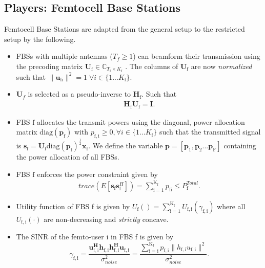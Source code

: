 \documentclass[12pt,a4paper]{report}
\begin{document}
\subsection{Players: Femtocell Base Stations}\label{conmodel_fbs}
Femtocell Base Stations are adapted from the general setup to the restricted setup by the following.
\begin{itemize}
\item 
	FBSs with multiple antennas ($T_f \geq 1$) can beamform their transmission using the precoding 	
	matrix $\mathbf{U}_{\mathrm{\text{f}}} \in \mathbb{C}_{T_{\text{f}} \times K_{\text{f}}}$ .
	The columns of $\mathbf{U}_{\mathrm{f}}$ are now \emph{normalized} such that 
	 $\|\mathbf{u}_{\mathrm{fi}}\|^2 =1 \;\forall i \in \{1 ... K_{\text{f}}\}$.
\\

\item 
$\mathbf{U}_f$ is selected as a pseudo-inverse to $\mathbf{H_\mathrm{f}}$.
Such that
\begin{gather*}
\mathbf{H}_{\mathrm{f}}  \mathbf{U_{\mathrm{f}}} = \mathbf{I}.
\end{gather*} 


\item  
	FBS $\text{f}$ allocates the transmit powers using the diagonal, power allocation  	
	matrix $\mathrm{diag}(\mathbf{p}_{\mathrm{f}})$ with $p_{\mathrm{f,i}} \geq 0, \forall i \in \{1 ... K_{\text{f}}\}$
such that the transmitted 		
	signal is 
	$\mathbf{s}_{\mathrm{f}	}= \mathbf{U_{\mathrm{f}}} 
	\mathrm{diag}(\mathbf{p}_{\mathrm{f}})^{\frac{1}{2}}
	\mathbf{x_{\mathrm{f}}}$. We define the variable $\mathbf{p}= [\mathbf{p}_1, \mathbf{p}_2...\mathbf{p}_{\text{F}}]$ containing the power allocation of all FBSs.
\\
\item 
	FBS $\text{f}$ enforces the power constraint given by
	\begin{gather*}
	trace(E[\mathbf{s}_\mathrm{f}\mathbf{s}_\mathrm{f}^H]) =
	\sum_{\mathrm{i=1}}^{\mathrm{K_{\mathrm{f}}}} p_{\mathrm{fi}}
	  \leq P^{Total}_{\text{f}}.
	  	\end{gather*}




\item 
	Utility function of FBS f is given by $U_{\text{f}}() =
	\sum_{\mathrm{i=1}}^{\mathrm{K_{\text{f}}}}
    	U_{\mathrm{f,i}}(\gamma_{\mathrm{f,i}}) $
    	where all $U_{\mathrm{f,i}}(\cdot)$ are non-decreasing and
    	\emph{strictly} concave.
\item The SINR of the femto-user i in FBS f is given by
\begin{equation}\label{zf_snr}
	\gamma_{\mathrm{f,i}} = 	\frac{\mathbf{u^H_{\mathrm{f,i}}h_{\mathrm{f,i}}h^H_{\mathrm{f,i}}u_{\mathrm{f,i}}}}
	{\sigma^2_{noise}  
	}=\frac{\sum_{\mathrm{i=i}}^{\mathrm{K_{f}}}
 p_{\mathrm{f,i}}\|h_{\mathrm{f,i}}u_{\mathrm{f,i}}\|^2}
	{\sigma^2_{noise}  
	}.
	\end{equation}

\end{itemize}
\end{document}
